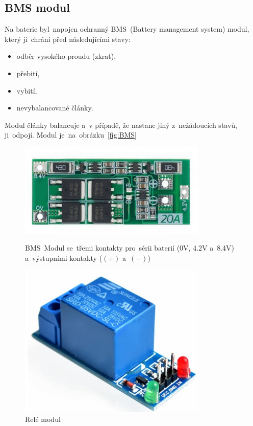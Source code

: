 \subsection{BMS modul}
Na baterie byl~napojen ochranný BMS~(Battery management system) modul, který ji~chrání před následujícími stavy:
\begin{itemize}
  \item odběr vysokého proudu (zkrat),
  \item přebití,
  \item vybití,
  \item nevybalancované články.
\end{itemize}
Modul články balancuje a~v případě, že nastane jiný z~nežádoucích stavů, ji~odpojí. Modul je~na~obrázku~\ref{fig:BMS}


\begin{figure}[htb]
  \centering
  \begin{minipage}{0.45\textwidth}
    \centering
  \includegraphics[width=0.8\textwidth]{img/BMS.jpg}
  \caption{\label{fig:BMS} BMS~Modul se~třemi kontakty pro~sérii baterií (0V, 4.2V a~8.4V) a~výstupními kontakty ($(+)$ a~$(-)$)~\cite{laskakit-BMS}}
  \end{minipage}\hfill
  \begin{minipage}{0.45\textwidth}
    \centering
  \includegraphics[width=0.8\textwidth]{img/relay.jpg}
  \caption{\label{fig:relay} Relé modul~\cite{laskakit-relay}}
  \end{minipage}
\end{figure}

